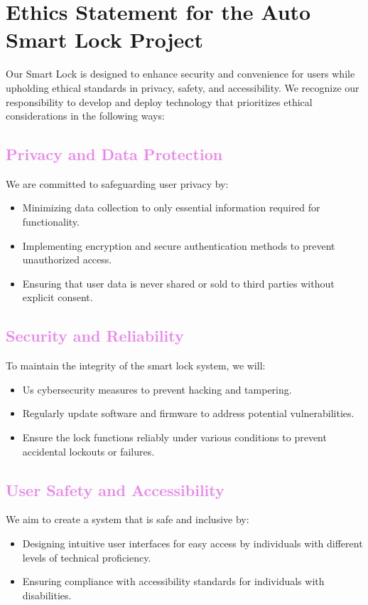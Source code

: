 \section{Ethics Statement for the Auto Smart Lock Project}
Our Smart Lock is designed to enhance security and convenience for users while upholding ethical standards in privacy, safety, and accessibility. We recognize our responsibility to develop and deploy technology that prioritizes ethical considerations in the following ways:

\textcolor{violet}{\subsection*{Privacy and Data Protection}}
We are committed to safeguarding user privacy by:
\begin{itemize}
    \item Minimizing data collection to only essential information required for functionality.
    \item Implementing encryption and secure authentication methods to prevent unauthorized access.
    \item Ensuring that user data is never shared or sold to third parties without explicit consent.
\end{itemize}

\textcolor{violet}{\subsection*{Security and Reliability}}
To maintain the integrity of the smart lock system, we will:
\begin{itemize}
    \item Us cybersecurity measures to prevent hacking and tampering.
    \item Regularly update software and firmware to address potential vulnerabilities.
    \item Ensure the lock functions reliably under various conditions to prevent accidental lockouts or failures.
\end{itemize}

\textcolor{violet}{\subsection*{User Safety and Accessibility}}
We aim to create a system that is safe and inclusive by:
\begin{itemize}
    \item Designing intuitive user interfaces for easy access by individuals with different levels of technical proficiency.
    \item Ensuring compliance with accessibility standards for individuals with disabilities.
\end{itemize}

